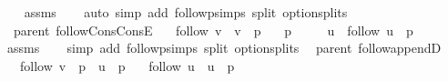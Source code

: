 \begin{isabellebody}
%
\isadeliminvisible
\isanewline
%
\endisadeliminvisible
%
\isadelimproof
\ \ %
\endisadelimproof
%
\isatagproof
{}\isamarkupfalse%
\ assms\isanewline
\ \ \isamarkupfalse%
\ {\isacharparenleft}{\kern0pt}auto\ simp\ add{\isacharcolon}{\kern0pt}\ follow{\isacharunderscore}{\kern0pt}psimps\ split{\isacharcolon}{\kern0pt}\ option{\isachardot}{\kern0pt}splits{\isacharparenleft}{\kern0pt}{}{\isacharparenright}{\kern0pt}{\isacharparenright}{\kern0pt}%
\endisatagproof
{\isafoldproof}%
%
\isadelimproof
\isanewline
%
\endisadelimproof
%
\isadeliminvisible
\isanewline
%
\endisadeliminvisible
%
\isataginvisible
{}\isamarkupfalse%
\ {\isacharparenleft}{\kern0pt}\ parent{\isacharparenright}{\kern0pt}\ follow{\isacharunderscore}{\kern0pt}Cons{\isacharunderscore}{\kern0pt}ConsE{\isacharcolon}{\kern0pt}\isanewline
\ \ \ {\isachardoublequoteopen}follow\ v\ {\isacharequal}{\kern0pt}\ v\ {\isacharhash}{\kern0pt}\ p{\isachardoublequoteclose}\isanewline
\ \ \ {\isachardoublequoteopen}p\ {\isasymnoteq}\ {\isacharbrackleft}{\kern0pt}{\isacharbrackright}{\kern0pt}{\isachardoublequoteclose}\isanewline
\ \ \ u\ \ {\isachardoublequoteopen}follow\ u\ {\isacharequal}{\kern0pt}\ p{\isachardoublequoteclose}%
\endisataginvisible
{\isafoldinvisible}%
%
\isadeliminvisible
\isanewline
%
\endisadeliminvisible
%
\isadelimproof
\ \ %
\endisadelimproof
%
\isatagproof
{}\isamarkupfalse%
\ assms\isanewline
\ \ \isamarkupfalse%
\ {\isacharparenleft}{\kern0pt}simp\ add{\isacharcolon}{\kern0pt}\ follow{\isacharunderscore}{\kern0pt}psimps\ split{\isacharcolon}{\kern0pt}\ option{\isachardot}{\kern0pt}splits{\isacharparenleft}{\kern0pt}{}{\isacharparenright}{\kern0pt}{\isacharparenright}{\kern0pt}%
\endisatagproof
{\isafoldproof}%
%
\isadelimproof
\isanewline
%
\endisadelimproof
%
\isadeliminvisible
\isanewline
%
\endisadeliminvisible
%
\isataginvisible
{}\isamarkupfalse%
\ {\isacharparenleft}{\kern0pt}\ parent{\isacharparenright}{\kern0pt}\ follow{\isacharunderscore}{\kern0pt}appendD{\isacharcolon}{\kern0pt}\isanewline
\ \ \ {\isachardoublequoteopen}follow\ v\ {\isacharequal}{\kern0pt}\ p\ {\isacharat}{\kern0pt}\ u\ {\isacharhash}{\kern0pt}\ p{\isacharprime}{\kern0pt}{\isachardoublequoteclose}\isanewline
\ \ \ {\isachardoublequoteopen}follow\ u\ {\isacharequal}{\kern0pt}\ u\ {\isacharhash}{\kern0pt}\ p{\isacharprime}{\kern0pt}{\isachardoublequoteclose}%

\end{isabellebody}
